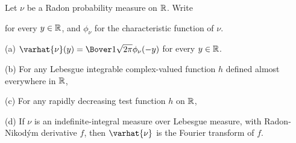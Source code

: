 
 Let $\nu$ be a Radon probability measure on
$\Bbb R$.   Write


\noindent for every $y\in\Bbb R$, and $\phi_{\nu}$ for the
characteristic function of $\nu$.


(a) $\varhat{\nu}(y)=\Bover1{\sqrt{2\pi}}\phi_{\nu}(-y)$ for every
$y\in\Bbb R$.

(b) For any Lebesgue integrable complex-valued function $h$ defined
almost everywhere in $\Bbb R$,


(c) For any rapidly decreasing test function $h$ on $\Bbb R$,


(d) If $\nu$ is an indefinite-integral measure over Lebesgue measure,
with Radon-Nikod\'ym derivative $f$, then $\varhat{\nu}$ is the Fourier
transform of $f$.

